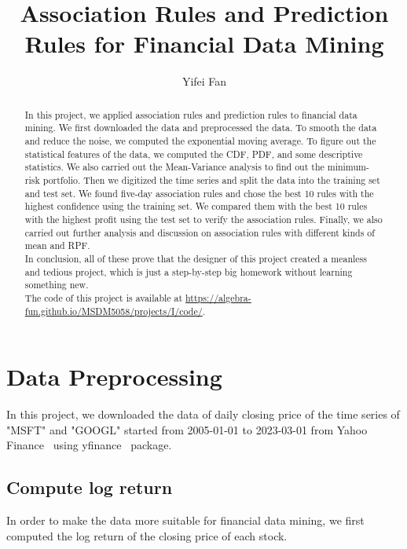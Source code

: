\documentclass[runningheads]{llncs}
\begin{document}
\title{Association Rules and Prediction Rules for Financial Data Mining}
\author{Yifei Fan}
\maketitle

\begin{abstract}
    In this project, we applied association rules and prediction rules to financial data mining.
    We first downloaded the data and preprocessed the data. 
    To smooth the data and reduce the noise, we computed the exponential moving average.
    To figure out the statistical features of the data, we computed the CDF, PDF, and some descriptive statistics.
    We also carried out the Mean-Variance analysis to find out the minimum-risk portfolio.
    Then we digitized the time series and split the data into the training set and test set.
    We found five-day association rules and chose the best 10 rules with the highest confidence using the training set.
    We compared them with the best 10 rules with the highest profit using the test set to verify the association rules.
    Finally, we also carried out further analysis and discussion on association rules with different kinds of mean and RPF.\\
    In conclusion, all of these prove that the designer of this project created a meanless and tedious project, 
    which is just a step-by-step big homework without learning something new.\\
    The code of this project is available at \url{https://algebra-fun.github.io/MSDM5058/projects/I/code/}.
\end{abstract}

\section{Data Preprocessing}
In this project, we downloaded the data of
daily closing price of the time series of "MSFT" and "GOOGL"
started from 2005-01-01 to 2023-03-01 from Yahoo Finance~\cite{yahoo_finance}
using yfinance~\cite{yfinance} package.
\subsection{Compute log return}
In order to make the data more suitable for financial data mining,
we first computed the log return of the closing price of each stock.
\end{document}
